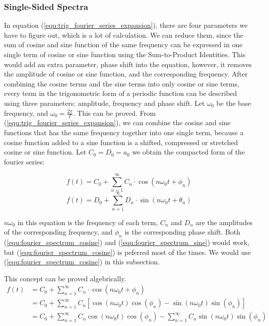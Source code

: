 \documentclass[12pt]{article}
\begin{document}
\subsubsection{Single-Sided Spectra}
In equation ({\ref{equ:trig_fourier_series_expansion}}), there are four parameters we have to figure out, 
which is a lot of calculation. We can reduce them, since the sum of cosine and sine function of the same frequency 
can be expressed in one single term of cosine or sine function using the Sum-to-Product Identities. 
This would add an extra parameter, phase shift into the equation, 
however, it removes the amplitude of cosine or sine function, and the corresponding frequency. 
After combining the cosine terms and the sine terms into only cosine or sine terms, 
every term in the trigonometric form of a periodic function can be described using 
three parameters: amplitude, frequency and phase shift. 
Let $\omega_0$ be the base frequency, and $\omega_0=\frac{2\pi}{T}$.
This can be proved. From ({\ref{equ:trig_fourier_series_expansion}}), 
we can combine the cosine and sine functions that has the same frequency together into one single term, 
because a cosine function added to a sine function is a shifted, compressed or stretched cosine or sine function.
Let $C_0 = D_0 = a_0$ we obtain the compacted form of the fourier series:

\begin{equation}
    f(t) =      C_0     +   \sum_{n=1}^{\infty} C_n \cdot \cos(n\omega_0t+\phi_n)
    \label{equ:fourier_spectrum_cosine}
\end{equation}
\begin{equation}
    f(t) =      D_0     +   \sum_{n=1}^{\infty} D_n \cdot \sin(n\omega_0t+\theta_n)
    \label{equ:fourier_spectrum_sine}
\end{equation}

$n\omega_0$ in this equation is the frequency of each term, 
$C_n$ and $D_n$ are the amplitudes of the corresponding frequency,
and $\phi_n$ is the corresponding phase shift. Both (\ref{equ:fourier_spectrum_cosine}) 
and (\ref{equ:fourier_spectrum_sine}) would work, 
but (\ref{equ:fourier_spectrum_cosine}) is peferred most of the times. 
We would use (\ref{equ:fourier_spectrum_cosine}) in this subsection.

This concept can be proved algebrically. 
$$\begin{aligned}
f(t) &= C_0  +  \sum_{n=1}^{\infty} C_n \cdot \cos(n\omega_0t+\phi_n)   \\
&= C_0  +  \sum_{n=1}^{\infty} C_n \left[ \cos(n\omega_0t)\cos(\phi_n) - \sin(n\omega_0t)\sin(\phi_n) \right]   \\
&= C_0  +  \sum_{n=1}^{\infty} C_n \cos(n\omega_0t)\cos(\phi_n) - \sum_{n=1}^{\infty} C_n \sin(n\omega_0t)\sin(\phi_n)
\end{aligned}$$
\end{document}
